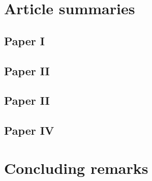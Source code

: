 \section{Article summaries} \label{Article summaries}

\subsection{Paper I} \label{Paper 1}

\subsection{Paper II} \label{Paper 2}

\subsection{Paper II} \label{Paper 3}

\subsection{Paper IV} \label{Paper 4}

\section{Concluding remarks} \label{Concluding remarks}

\clearpage





